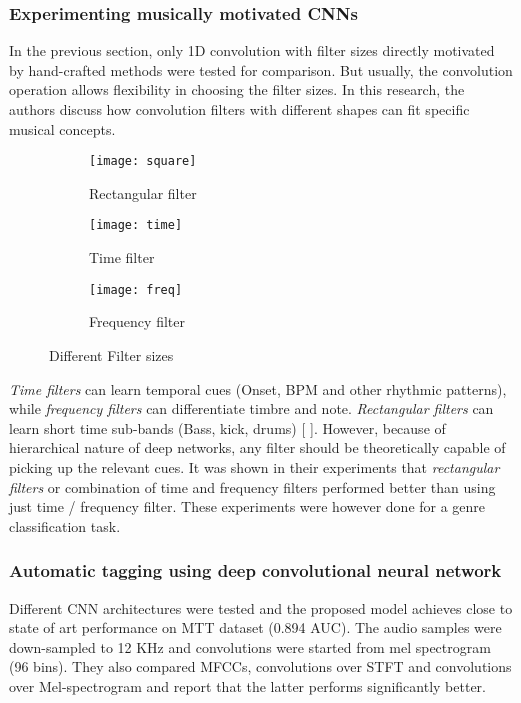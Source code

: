 \subsubsection{Experimenting musically motivated CNNs}
In the previous section, only 1D convolution with filter sizes directly motivated by hand-crafted methods were tested for comparison. But usually, the convolution operation allows flexibility in choosing the filter sizes. In this research, the authors discuss how convolution filters with different shapes can fit specific musical concepts. 
\begin{figure}[h]
       \begin{subfigure}[b]{0.3\textwidth}
        \texttt{[image: square]}
        \caption{Rectangular filter }
        \label{fig:square}
       \end{subfigure}
	    \begin{subfigure}[b]{0.3\textwidth}
        \texttt{[image: time]}
        \caption{
        Time filter
        }
        \label{fig:time}
       \end{subfigure}
       	    \begin{subfigure}[b]{0.3\textwidth}
        \texttt{[image: freq]}
        \caption{
        Frequency filter
        }
        \label{fig:freq}
       \end{subfigure}
       \caption{Different Filter sizes}\label{fig:STFT}
\end{figure}
\FloatBarrier
\bigskip 
\noindent \textit{Time filters} can learn temporal cues (Onset, BPM and other rhythmic patterns), while \textit{frequency filters} can differentiate timbre and note. \textit{Rectangular filters} can learn short time sub-bands (Bass, kick, drums) [ ]. However, because of hierarchical nature of deep networks, any filter should be theoretically capable of picking up the relevant cues. It was shown in their experiments that \textit{rectangular filters} or combination of time and frequency filters performed better than using just time / frequency filter. These experiments were however done for a genre classification task.  

\subsubsection{Automatic tagging using deep convolutional neural network}
Different CNN architectures were tested and the proposed model achieves close to state of art performance on MTT dataset (0.894 AUC). The audio samples were down-sampled to 12 KHz and convolutions were started from mel spectrogram (96 bins). They also compared MFCCs, convolutions over STFT and convolutions over Mel-spectrogram and report that the latter performs significantly better.

